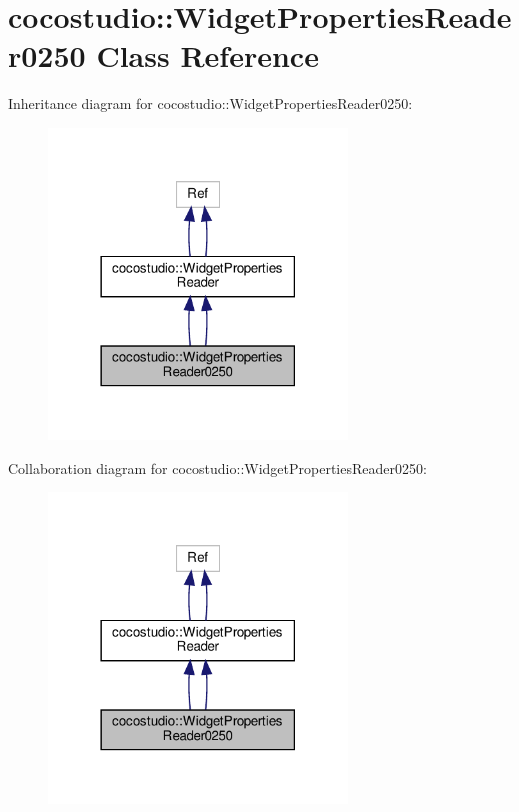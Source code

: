 \hypertarget{classcocostudio_1_1WidgetPropertiesReader0250}{}\section{cocostudio\+:\+:Widget\+Properties\+Reader0250 Class Reference}
\label{classcocostudio_1_1WidgetPropertiesReader0250}


Inheritance diagram for cocostudio\+:\+:Widget\+Properties\+Reader0250\+:
\nopagebreak
\begin{figure}[H]
\begin{center}
\leavevmode
\includegraphics[width=225pt]{classcocostudio_1_1WidgetPropertiesReader0250__inherit__graph}
\end{center}
\end{figure}


Collaboration diagram for cocostudio\+:\+:Widget\+Properties\+Reader0250\+:
\nopagebreak
\begin{figure}[H]
\begin{center}
\leavevmode
\includegraphics[width=225pt]{classcocostudio_1_1WidgetPropertiesReader0250__coll__graph}
\end{center}
\end{figure}
